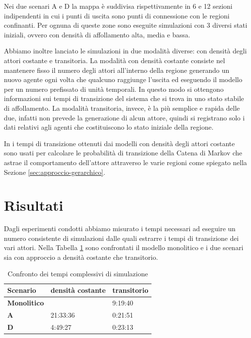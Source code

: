 Nei due scenari A e D la mappa è suddivisa rispettivamente in 6 e 12 sezioni indipendenti in cui i punti di uscita sono punti di connessione con le regioni confinanti. Per ognuna di queste zone sono eseguite simulazioni con 3 diversi stati iniziali, ovvero con densità di affollamento alta, media e bassa. 

Abbiamo inoltre lanciato le simulazioni in due modalità diverse: con densità degli attori costante e transitoria. La modalità con densità costante consiste nel mantenere fisso il numero degli attori all'interno della regione generando un nuovo agente ogni volta che qualcuno raggiunge l'uscita ed eseguendo il modello per un numero prefissato di unità temporali. In questo modo si ottengono informazioni sui tempi di transizione del sistema che si trova in uno stato stabile di affollamento. La modalità transitoria, invece, è la più semplice e rapida delle due, infatti non prevede la generazione di alcun attore, quindi si registrano solo i dati relativi agli agenti che costituiscono lo stato iniziale della regione.

In \cite{esperimenti-sandro} i tempi di transizione ottenuti dai modelli con densità degli attori costante sono usati per calcolare le probabilità di transizione della Catena di Markov che astrae il comportamento dell'attore attraverso le varie regioni come spiegato nella Sezione \ref{sec:approccio-gerarchico}.



\section{Risultati}

Dagli esperimenti condotti abbiamo misurato i tempi necessari ad eseguire un numero consistente di simulazioni dalle quali estrarre i tempi di transizione dei vari attori. Nella Tabella \ref{tab:tabella-confronto} sono confrontati il modello monolitico e i due scenari sia con approccio a densità costante che transitorio. 

\begin{table}[h]
  \centering
  \resizebox{0.7\textwidth}{!} {
  \begin{tabular}{ |l|l|l| }
	\hline
	\textbf{Scenario}	&		\textbf{densità costante}	&		\textbf{transitorio}	\\ \hline
	\textbf{Monolitico} &		 						&		9:19:40		\\ \hline
	\textbf{A}			 &		21:33:36 				&		0:21:51		\\ \hline
	\textbf{D}			 &		4:49:27 				&		0:23:13		\\ \hline

  \end{tabular}
  }
  \caption{Confronto dei tempi complessivi di simulazione}
  \label{tab:tabella-confronto}
\end{table}

